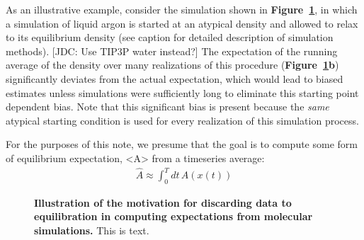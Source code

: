 \documentclass[aps,pre,twocolumn,nofootinbib,superscriptaddress,linenumbers,11point]{revtex4-1}
\begin{document}
As an illustrative example, consider the simulation shown in {\bf Figure~\ref{figure:burn-in-example}}, in which a simulation of liquid argon is started at an atypical density and allowed to relax to its equilibrium density (see caption for detailed description of simulation methods).
{\color{red}[JDC: Use TIP3P water instead?]}
The expectation of the running average of the density over many realizations of this procedure ({\bf Figure~\ref{figure:burn-in-example}b}) significantly deviates from the actual expectation, which would lead to biased estimates unless simulations were sufficiently long to eliminate this starting point dependent bias.
Note that this significant bias is present because the \emph{same} atypical starting condition is used for every realization of this simulation process.

For the purposes of this note, we presume that the goal is to compute some form of equilibrium expectation, <A> from a timeseries average:
\begin{eqnarray}
\hat{A} \approx \int_0^T dt \, A(x(t))
\end{eqnarray}


\begin{figure} 
\caption{\label{figure:burn-in-example} {\bf Illustration of the motivation for discarding data to equilibration in computing expectations from molecular simulations.} 
This is text.}
\end{figure}

\end{document}
